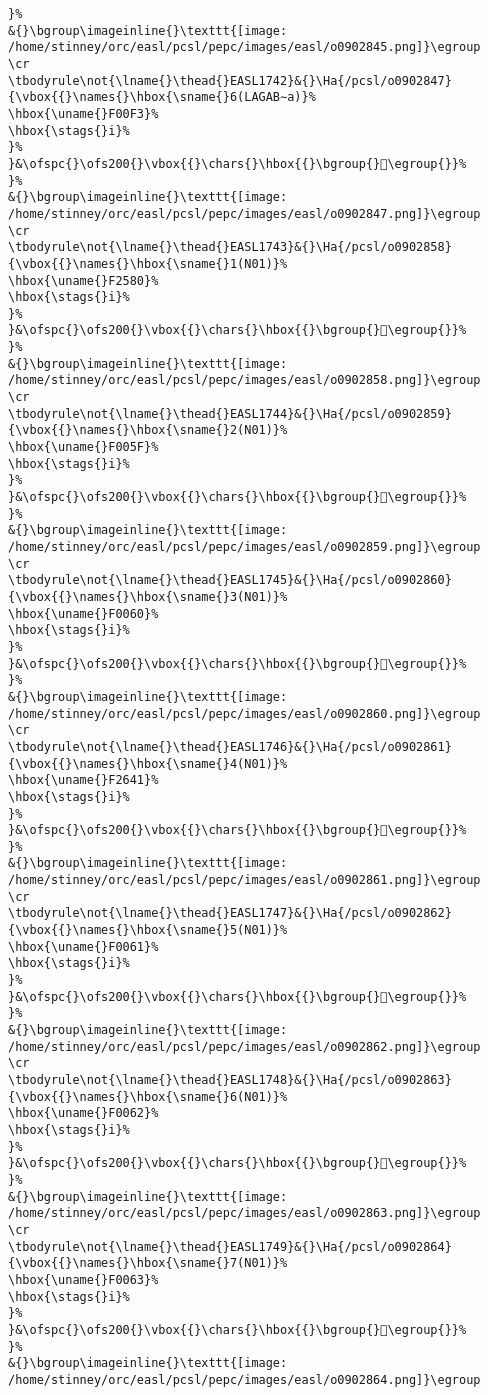 \begin{verbatim}
}%
&{}\bgroup\imageinline{}\texttt{[image: /home/stinney/orc/easl/pcsl/pepc/images/easl/o0902845.png]}\egroup
\cr
\tbodyrule\not{\lname{}\thead{}EASL1742}&{}\Ha{/pcsl/o0902847}{\vbox{{}\names{}\hbox{\sname{}6(LAGAB∼a)}%
\hbox{\uname{}F00F3}%
\hbox{\stags{}i}%
}%
}&\ofspc{}\ofs200{}\vbox{{}\chars{}\hbox{{}\bgroup{}󰃳\egroup{}}%
}%
&{}\bgroup\imageinline{}\texttt{[image: /home/stinney/orc/easl/pcsl/pepc/images/easl/o0902847.png]}\egroup
\cr
\tbodyrule\not{\lname{}\thead{}EASL1743}&{}\Ha{/pcsl/o0902858}{\vbox{{}\names{}\hbox{\sname{}1(N01)}%
\hbox{\uname{}F2580}%
\hbox{\stags{}i}%
}%
}&\ofspc{}\ofs200{}\vbox{{}\chars{}\hbox{{}\bgroup{}󲖀\egroup{}}%
}%
&{}\bgroup\imageinline{}\texttt{[image: /home/stinney/orc/easl/pcsl/pepc/images/easl/o0902858.png]}\egroup
\cr
\tbodyrule\not{\lname{}\thead{}EASL1744}&{}\Ha{/pcsl/o0902859}{\vbox{{}\names{}\hbox{\sname{}2(N01)}%
\hbox{\uname{}F005F}%
\hbox{\stags{}i}%
}%
}&\ofspc{}\ofs200{}\vbox{{}\chars{}\hbox{{}\bgroup{}󰁟\egroup{}}%
}%
&{}\bgroup\imageinline{}\texttt{[image: /home/stinney/orc/easl/pcsl/pepc/images/easl/o0902859.png]}\egroup
\cr
\tbodyrule\not{\lname{}\thead{}EASL1745}&{}\Ha{/pcsl/o0902860}{\vbox{{}\names{}\hbox{\sname{}3(N01)}%
\hbox{\uname{}F0060}%
\hbox{\stags{}i}%
}%
}&\ofspc{}\ofs200{}\vbox{{}\chars{}\hbox{{}\bgroup{}󰁠\egroup{}}%
}%
&{}\bgroup\imageinline{}\texttt{[image: /home/stinney/orc/easl/pcsl/pepc/images/easl/o0902860.png]}\egroup
\cr
\tbodyrule\not{\lname{}\thead{}EASL1746}&{}\Ha{/pcsl/o0902861}{\vbox{{}\names{}\hbox{\sname{}4(N01)}%
\hbox{\uname{}F2641}%
\hbox{\stags{}i}%
}%
}&\ofspc{}\ofs200{}\vbox{{}\chars{}\hbox{{}\bgroup{}󲙁\egroup{}}%
}%
&{}\bgroup\imageinline{}\texttt{[image: /home/stinney/orc/easl/pcsl/pepc/images/easl/o0902861.png]}\egroup
\cr
\tbodyrule\not{\lname{}\thead{}EASL1747}&{}\Ha{/pcsl/o0902862}{\vbox{{}\names{}\hbox{\sname{}5(N01)}%
\hbox{\uname{}F0061}%
\hbox{\stags{}i}%
}%
}&\ofspc{}\ofs200{}\vbox{{}\chars{}\hbox{{}\bgroup{}󰁡\egroup{}}%
}%
&{}\bgroup\imageinline{}\texttt{[image: /home/stinney/orc/easl/pcsl/pepc/images/easl/o0902862.png]}\egroup
\cr
\tbodyrule\not{\lname{}\thead{}EASL1748}&{}\Ha{/pcsl/o0902863}{\vbox{{}\names{}\hbox{\sname{}6(N01)}%
\hbox{\uname{}F0062}%
\hbox{\stags{}i}%
}%
}&\ofspc{}\ofs200{}\vbox{{}\chars{}\hbox{{}\bgroup{}󰁢\egroup{}}%
}%
&{}\bgroup\imageinline{}\texttt{[image: /home/stinney/orc/easl/pcsl/pepc/images/easl/o0902863.png]}\egroup
\cr
\tbodyrule\not{\lname{}\thead{}EASL1749}&{}\Ha{/pcsl/o0902864}{\vbox{{}\names{}\hbox{\sname{}7(N01)}%
\hbox{\uname{}F0063}%
\hbox{\stags{}i}%
}%
}&\ofspc{}\ofs200{}\vbox{{}\chars{}\hbox{{}\bgroup{}󰁣\egroup{}}%
}%
&{}\bgroup\imageinline{}\texttt{[image: /home/stinney/orc/easl/pcsl/pepc/images/easl/o0902864.png]}\egroup

\end{verbatim}
